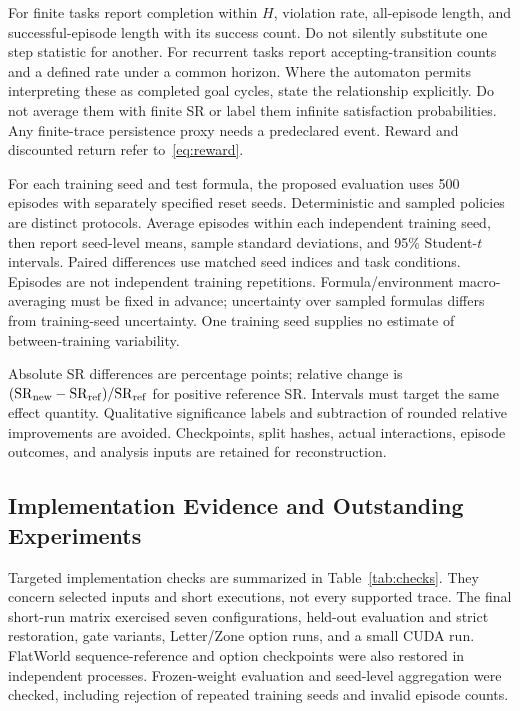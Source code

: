 \documentclass[conference]{IEEEtran}
\begin{document}
For finite tasks report completion within $H$, violation rate, all-episode length, and successful-episode length with its success count. Do not silently substitute one step statistic for another. For recurrent tasks report accepting-transition counts and a defined rate under a common horizon. Where the automaton permits interpreting these as completed goal cycles, state the relationship explicitly. Do not average them with finite SR or label them infinite satisfaction probabilities. Any finite-trace persistence proxy needs a predeclared event. Reward and discounted return refer to~\eqref{eq:reward}.

For each training seed and test formula, the proposed evaluation uses 500 episodes with separately specified reset seeds. Deterministic and sampled policies are distinct protocols. Average episodes within each independent training seed, then report seed-level means, sample standard deviations, and 95\% Student-$t$ intervals. Paired differences use matched seed indices and task conditions. Episodes are not independent training repetitions. Formula/environment macro-averaging must be fixed in advance; uncertainty over sampled formulas differs from training-seed uncertainty. One training seed supplies no estimate of between-training variability.

Absolute SR differences are percentage points; relative change is $(\mathrm{SR}_{\rm new}-\mathrm{SR}_{\rm ref})/\mathrm{SR}_{\rm ref}$ for positive reference SR. Intervals must target the same effect quantity. Qualitative significance labels and subtraction of rounded relative improvements are avoided. Checkpoints, split hashes, actual interactions, episode outcomes, and analysis inputs are retained for reconstruction.

\subsection{Implementation Evidence and Outstanding Experiments}
\label{sec:evidence}
Targeted implementation checks are summarized in Table~\ref{tab:checks}. They concern selected inputs and short executions, not every supported trace. The final short-run matrix exercised seven configurations, held-out evaluation and strict restoration, gate variants, Letter/Zone option runs, and a small CUDA run. FlatWorld sequence-reference and option checkpoints were also restored in independent processes. Frozen-weight evaluation and seed-level aggregation were checked, including rejection of repeated training seeds and invalid episode counts.
\end{document}
